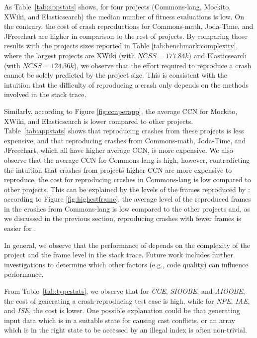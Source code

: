 As Table~\ref{tab:appstats} shows, for four projects (Commons-lang, Mockito, XWiki, and Elasticsearch) the median number of fitness evaluations is low.
On the contrary, the cost of crash reproductions for Commons-math, Joda-Time, and JFreechart are  higher in comparison to the rest of projects.
By comparing those results with the projects sizes reported in Table \ref{tab:benchmark:complexity}, where the largest projects are XWiki (with $\overline{NCSS}=177.84k$) and Elasticsearch (with $\overline{NCSS}=124.36k$), we observe that the effort required to reproduce a crash cannot be solely predicted by the project size. 
This is consistent with the intuition that the difficulty of reproducing a crash only depends on the methods involved in the stack trace.

Similarly, according to Figure \ref{fig:ccnperapp}, the average CCN for Mockito, XWiki, and Elasticsearch is lower compared to other projects. 
Table~\ref{tab:appstats} shows that reproducing crashes from these projects is less expensive, and that reproducing crashes from Commons-math, Joda-Time, and JFreechart, which all have higher average CCN, is more expensive.
We also observe that the average CCN for Commons-lang is high, however, contradicting the intuition that crashes from projects higher CCN are more expensive to reproduce, the cost for reproducing crashes in Commons-lang is low compared to other projects.
%
This can be explained by the levels of the frames reproduced by \evocrash: according to Figure \ref{fig:highestframe}, the average level of the reproduced frames in the crashes from Commons-lang is low compared to the other projects and, as we discussed in the previous section, reproducing crashes with fewer frames is easier for \evocrash.

In general, we observe that the performance of \evocrash depends on the complexity of the project and the frame level in the stack trace. Future work includes further investigations to determine which other factors (e.g., code quality) can influence \evocrash performance. 

From Table~\ref{tab:typestats}, we observe that for \textit{CCE}, \textit{SIOOBE}, and \textit{AIOOBE}, the cost of generating a crash-reproducing test case is high, while for \textit{NPE}, \textit{IAE}, and \textit{ISE}, the cost is lower.
One possible explanation could be that generating input data which is in a suitable state for causing cast conflicts, or an array which is in the right state to be accessed by an illegal index is often non-trivial.

